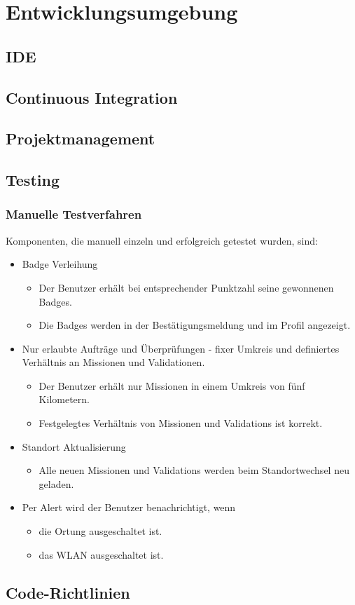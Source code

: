 \chapter{Entwicklungsumgebung}
\label{pd-entwicklungsumgebung}


\section{IDE}


\section{Continuous Integration}


\section{Projektmanagement}


\section{Testing}

\subsection{Manuelle Testverfahren}
Komponenten, die manuell einzeln und erfolgreich getestet wurden, sind:

\begin{itemize}
	\item Badge Verleihung
	\begin{itemize}
		\item Der Benutzer erhält bei entsprechender Punktzahl seine gewonnenen Badges.
		\item Die Badges werden in der Bestätigungsmeldung und im Profil angezeigt.
	\end{itemize}
	\item Nur erlaubte Aufträge und Überprüfungen - fixer Umkreis und definiertes Verhältnis an Missionen und Validationen.
	\begin{itemize}
		\item Der Benutzer erhält nur Missionen in einem Umkreis von fünf Kilometern.
		\item Festgelegtes Verhältnis von Missionen und Validations ist korrekt.
	\end{itemize}
	\item Standort Aktualisierung
	\begin{itemize}
		\item Alle neuen Missionen und Validations werden beim Standortwechsel neu geladen.
	\end{itemize}
	\item Per Alert wird der Benutzer benachrichtigt, wenn
	\begin{itemize}
		\item die Ortung ausgeschaltet ist.
		\item das WLAN ausgeschaltet ist.
	\end{itemize}
\end{itemize}


\section{Code-Richtlinien}